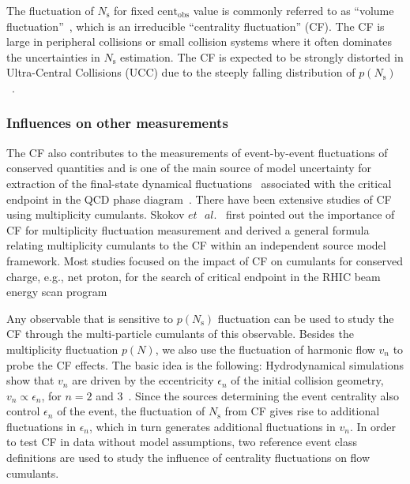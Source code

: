 The fluctuation of $N_\text{s}$ for fixed $\text{cent}_\text{obs}$ value is commonly referred to as ``volume fluctuation''~\cite{Jeon:2003gk, Skokov:2012ds, Luo:2013bmi}, which is an irreducible ``centrality fluctuation'' (CF). The CF is large in peripheral collisions or small collision systems where it often dominates the uncertainties in $N_\text{s}$ estimation. The CF is expected to be strongly distorted in Ultra-Central Collisions (UCC) due to the steeply falling distribution of $p(N_\text{s})$~\cite{Skokov:2012ds, Xu:2016qzd, Bzdak:2016jxo}.



\subsubsection{Influences on other measurements}

The CF also contributes to the measurements of event-by-event fluctuations of conserved quantities and is one of the main source of model uncertainty for extraction of the final-state dynamical fluctuations~\cite{Aggarwal:2010wy, Adamczyk:2013dal, Adamczyk:2014fia} associated with the critical endpoint in the QCD phase diagram~\cite{Luo:2017faz, Li:2017via}. There have been extensive studies of CF using multiplicity cumulants. Skokov $et\text{ }al.$~\cite{Skokov:2012ds} first pointed out the importance of CF for multiplicity fluctuation measurement and derived a general formula relating multiplicity cumulants to the CF within an independent source model framework. Most studies focused on the impact of CF on cumulants for conserved charge, e.g., net proton, for the search of critical endpoint in the RHIC beam energy scan program~\cite{Luo:2013bmi, Braun-Munzinger:2016yjz, Kitazawa:2017ljq}

Any observable that is sensitive to $p(N_\text{s})$ fluctuation can be used to study the CF through the multi-particle cumulants of this observable. Besides the multiplicity fluctuation $p(N)$, we also use the fluctuation of harmonic flow $v_n$ to probe the CF effects. The basic idea is the following: Hydrodynamical simulations show that $v_n$ are driven by the eccentricity $\epsilon_n$ of the initial collision geometry, $v_n \propto \epsilon_n$, for $n=2$ and 3~\cite{Qiu:2011iv, Gardim:2011xv, Niemi:2012aj}. Since the sources determining the event centrality also control $\epsilon_n$ of the event, the fluctuation of $N_\text{s}$ from CF gives rise to additional fluctuations in $\epsilon_n$, which in turn generates additional fluctuations in $v_n$. In order to test CF in data without model assumptions, two reference event class definitions are used to study the influence of centrality fluctuations on flow cumulants.



